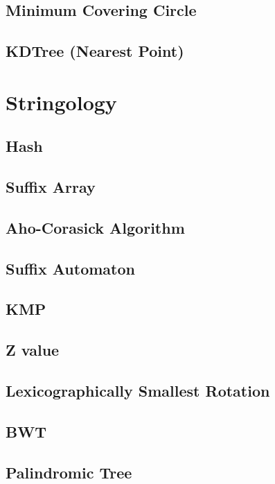 \documentclass[a4paper,10pt,twocolumn,oneside]{article}
\begin{document}
\subsection{Minimum Covering Circle}

\subsection{KDTree (Nearest Point)}


\section{Stringology}
\subsection{Hash}

\subsection{Suffix Array}

\subsection{Aho-Corasick Algorithm}

\subsection{Suffix Automaton}

\subsection{KMP}

\subsection{Z value}

\subsection{Lexicographically Smallest Rotation}

\subsection{BWT}

\subsection{Palindromic Tree}

\end{document}
